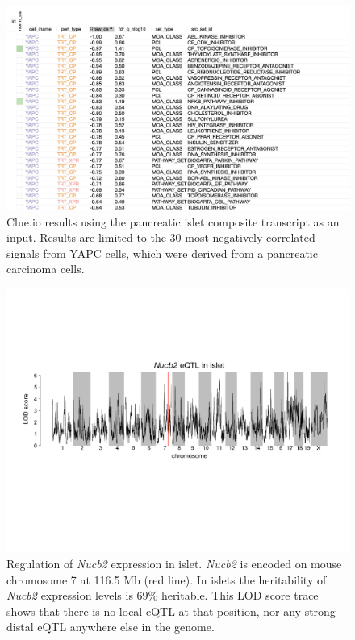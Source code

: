 \documentclass[
]{article}
\begin{document}
\begin{figure}[ht!]
\includegraphics[width=\textwidth]{Figures/Supp_Fig_Islet_YAPC.png} 
\caption{Clue.io results using the pancreatic islet composite transcript as 
an input. Results are limited to the 30 most negatively correlated signals
from YAPC cells, which were derived from a pancreatic carcinoma cells.
}
\label{fig:clue_islet_yapc}
\end{figure}

\begin{figure}[ht!]
\includegraphics[width=\textwidth]{Figures/Supplemental_FigX_Nucb2_eQTL.pdf} 
\caption{Regulation of \textit{Nucb2} expression in islet. \textit{Nucb2} 
is encoded on mouse chromosome 7 at 116.5 Mb (red line). In islets the 
heritability of \textit{Nucb2} expression levels is 69\% heritable. This 
LOD score trace shows that there is no local eQTL at that position, nor 
any strong distal eQTL anywhere else in the genome. 
}
\label{fig:Nucb2_eqtl}
\end{figure}

\clearpage



\end{document}
